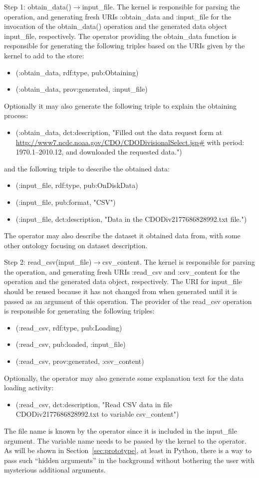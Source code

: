 Step 1: obtain\_data()$\rightarrow$input\_file. The kernel is responsible for parsing the operation, and generating fresh URIs :obtain\_data and :input\_file for the invocation of the obtain\_data() operation and the generated data object input\_file, respectively. The operator providing the obtain\_data function is responsible for generating the following triples based on the URIs given by the kernel to add to the store:
\begin{itemize}
	\item (:obtain\_data, rdf:type, pub:Obtaining)
	\item (:obtain\_data, prov:generated, :input\_file)
\end{itemize}
Optionally it may also generate the following triple to explain the obtaining process:
\begin{itemize}
	\item (:obtain\_data, dct:description, "Filled out the data request form at \url{http://www7.ncdc.noaa.gov/CDO/CDODivisionalSelect.jsp#} with period: 1970.1--2010.12, and downloaded the requested data.")
\end{itemize}
and the following triple to describe the obtained data:
\begin{itemize}
	\item (:input\_file, rdf:type, pub:OnDiskData)
	\item (:input\_file, pub:format, "CSV")
	\item (:input\_file, dct:description, "Data in the CDODiv2177686828992.txt file.")
\end{itemize}
The operator may also describe the dataset it obtained data from, with some other ontology focusing on dataset description.

Step 2: read\_csv(input\_file)$\rightarrow$csv\_content. The kernel is responsible for parsing the operation, and generating fresh URIs :read\_csv and :csv\_content for the operation and the generated data object, respectively. The URI for input\_file should be reused because it has not changed from when generated until it is passed as an argument of this operation. The provider of the read\_csv operation is responsible for generating the following triples:
\begin{itemize}
	\item (:read\_csv, rdf:type, pub:Loading)
	\item (:read\_csv, pub:loaded, :input\_file)
	\item (:read\_csv, prov:generated, :csv\_content)
\end{itemize}
Optionally, the operator may also generate some explanation text for the data loading activity:
\begin{itemize}
	\item (:read\_csv, dct:description, "Read CSV data in file CDODiv2177686828992.txt to variable csv\_content")
\end{itemize}
The file name is known by the operator since it is included in the input\_file argument. The variable name needs to be passed by the kernel to the operator. As will be shown in Section~\ref{sec:prototype}, at least in Python, there is a way to pass such ``hidden arguments'' in the background without bothering the user with mysterious additional arguments.

